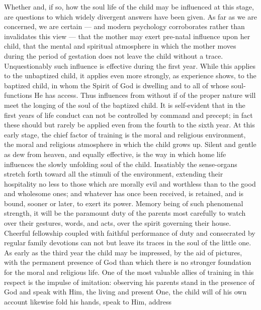 Whether and, if so, how the soul life of the child may be influenced at this stage, are questions to which widely divergent answers have been given. As far as we are concerned, we are certain — and modern psychology corroborates rather than invalidates this view — that the mother may exert pre-natal influence upon her child, that the mental and spiritual atmosphere in which the mother moves during the
period of gestation does not leave the child without a trace. Unquestionably such influence is effective during the first year. While this applies to the unbaptized child, it applies even more strongly, as experience shows, to the baptized child, in whom the Spirit of God is dwelling and to all of whose soul-functions He has access. Thus influences from without if of the proper nature will meet the longing of the soul of the baptized child. It is self-evident that in the first years of life conduct can not be controlled by command and precept; in fact these should but rarely be applied even from the fourth to the sixth year. At this early stage, the chief factor of training is the moral and religious environment, the moral and religious atmosphere in which the child grows up. Silent and gentle as dew from heaven, and equally effective, is the way in which home life influences the slowly unfolding soul of the child. Insatiably the sense-organs stretch forth toward all the stimuli of the environment, extending their hospitality no less to those which are morally evil and worthless than to the good and wholesome ones; and whatever has once been received, is retained, and is bound, sooner or later, to exert its power. Memory being of such phenomenal strength, it will be the paramount duty of the parents most carefully to watch over their gestures, words, and acts, over the spirit governing their house. Cheerful fellowship coupled with faithful performance of duty and consecrated by regular family devotions can not but leave its traces in the soul of the little one. As early as the third year the child may be impressed, by the aid of pictures, with the permanent presence of God than which there is no stronger foundation for the moral and religious life. One of the most valuable allies of training in this respect is the impulse of imitation: observing his parents stand in the presence of God and speak with Him, the living and present One, the child will of his own account likewise fold his hands, speak to Him, address
